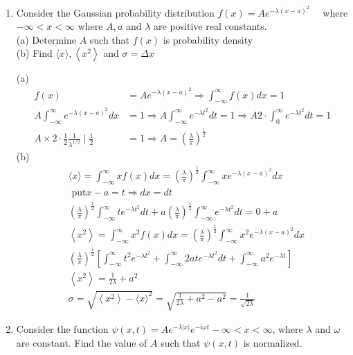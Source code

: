 \begin{enumerate}
	\item Consider the Gaussian probability distribution $f(x)=A e^{-\lambda(x-a)^{2}} \quad$ where $-\infty<x<\infty$ where $A, a$ and $\lambda$ are positive real constants.\\
	(a) Determine $A$ such that $f(x)$ is probability density\\
	(b) Find $\langle x\rangle,\left\langle x^{2}\right\rangle$ and $\sigma=\Delta x$\\
\begin{answer}
	(a)
	\begin{align*}
		f(x)&=A e^{-\lambda(x-a)^{2}} \Rightarrow \int_{-\infty}^{\infty} f(x) d x=1\\
	A \int_{-\infty}^{\infty} e^{-\lambda(x-a)^{2}} d x&=1 \Rightarrow A \int_{-\infty}^{\infty} e^{-\lambda t^{2}} d t=1 \Rightarrow A 2 \cdot \int_{0}^{\infty} e^{-\lambda t^{2}} d t=1\\
	A \times 2 \cdot \frac{1}{2} \frac{1}{\lambda^{1 / 2}} \mid \frac{1}{2}&=1 \Rightarrow A=\left(\frac{\lambda}{\pi}\right)^{\frac{1}{2}}
	\end{align*}
	(b)
	\begin{align*}
	&\langle x\rangle=\int_{-\infty}^{\infty} x f(x) d x=\left(\frac{\lambda}{\pi}\right)^{\frac{1}{2}} \int_{-\infty}^{\infty} x e^{-\lambda(x-a)^{2}} d x\\
	&\text{	put} x-a=t \Rightarrow d x=d t\\
	&\left(\frac{\lambda}{\pi}\right)^{\frac{1}{2}} \int_{-\infty}^{\infty} t e^{-\lambda t^{2}} d t+a\left(\frac{\lambda}{\pi}\right)^{\frac{1}{2}} \int_{-\infty}^{\infty} e^{-\lambda t^{2}} d t=0+a\\
	&\left\langle x^{2}\right\rangle=\int_{-\infty}^{\infty} x^{2} f(x) d x=\left(\frac{\lambda}{\pi}\right)^{\frac{1}{2}} \int_{-\infty}^{\infty} x^{2} e^{-\lambda(x-a)^{2}} d x\\
		&\left(\frac{\lambda}{\pi}\right)^{\frac{1}{2}}\left[\int_{-\infty}^{\infty} t^{2} e^{-\lambda t^{2}}+\int_{-\infty}^{\infty} 2 a t e^{-\lambda t^{2}} d t+\int_{-\infty}^{\infty} a^{2} e^{-\lambda t}\right]\\
		&\left\langle x^{2}\right\rangle=\frac{1}{2 \lambda}+a^{2} \\
		&\sigma=\sqrt{\left\langle x^{2}\right\rangle-\langle x\rangle^{2}}=\sqrt{\frac{1}{2 \lambda}+a^{2}-a^{2}}=\frac{1}{\sqrt{2 \lambda}}
	\end{align*}
\end{answer}
	\item Consider the function $\psi(x, t)=A e^{-\lambda|x|} e^{-i \omega t}-\infty<x<\infty$, where $\lambda$ and $\omega$ are constant. Find the value of $A$ such that $\psi(x, t)$ is normalized.

\end{enumerate}
